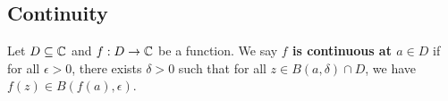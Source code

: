 \documentclass[a4paper]{report}
\begin{document}
\subsection{Continuity}

\begin{definition}[Continuity]
    Let \( D \subseteq \mathbb{C}   \) and \( f: D \to \mathbb{C}  \) be a function. We say \textbf{\( f  \) is continuous at \( a \in D  \)} if for all \( \epsilon > 0  \), there exists \( \delta > 0  \) such that for all \( z \in B(a,\delta) \cap D \), we have \( f(z) \in B(f(a), \epsilon) \).
\end{definition}
\end{document}
